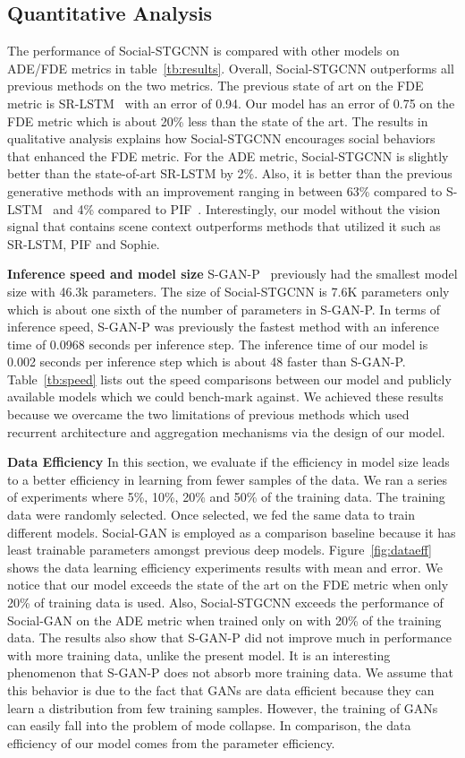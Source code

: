 \documentclass[10pt,twocolumn,letterpaper]{article}
\newcommand*{\ours}{Social-STGCNN }
\begin{document}
\subsection{Quantitative Analysis}
The performance of \ours is compared with other models on ADE/FDE metrics in table~\ref{tb:results}. Overall, \ours outperforms all previous methods on the two metrics. The previous state of art on the FDE metric is SR-LSTM~\cite{zhang2019sr} with an error of 0.94. Our model has an error of 0.75 on the FDE metric which is about 20\% less than the state of the art. The results in qualitative analysis explains how \ours encourages social behaviors that enhanced the FDE metric. For the ADE metric, \ours is slightly better than the state-of-art SR-LSTM by 2\%. Also, it is better than the previous generative methods with an improvement ranging in between 63\% compared to S-LSTM~\cite{alahi2016social} and 4\% compared to PIF~\cite{liang2019peeking}. Interestingly, our model without the vision signal that contains scene context outperforms methods that utilized it such as SR-LSTM, PIF and Sophie.

\noindent
\textbf{Inference speed and model size} S-GAN-P~\cite{gupta2018social} previously had the smallest model size with 46.3k parameters. The size of \ours is 7.6K parameters only which is about one sixth of the number of parameters in S-GAN-P. In terms of inference speed, S-GAN-P was previously the fastest method with an inference time of 0.0968 seconds per inference step. The inference time of our model is 0.002 seconds per inference step which is about 48  faster than S-GAN-P. Table~\ref{tb:speed} lists out the speed comparisons between our model and publicly available models which we could bench-mark against. We achieved these results because we overcame the two limitations of previous methods which used recurrent architecture and aggregation mechanisms via the design of our model.



\noindent
\textbf{Data Efficiency} In this section, we evaluate if the efficiency in model size leads to a better efficiency in learning from fewer samples of the data. We ran a series of experiments where 5\%, 10\%, 20\% and 50\% of the training data. The training data were randomly selected. Once selected, we fed the same data to train different models. Social-GAN is employed as a comparison baseline because it has least trainable parameters amongst previous deep models. Figure~\ref{fig:dataeff} shows the data learning efficiency experiments results with mean and error. We notice that our model exceeds the state of the art on the FDE metric when only 20\% of training data is used. Also, \ours exceeds the  performance of Social-GAN on the ADE metric when trained only on with 20\% of the training data. The results also show that S-GAN-P did not improve much in performance with more training data, unlike the present model. It is an interesting phenomenon that S-GAN-P does not absorb more training data. We assume that this behavior is due to the fact that GANs are data efficient because they can learn a distribution from few training samples. However, the training of GANs can easily fall into the problem of mode collapse. In comparison, the data efficiency of our model comes from the parameter efficiency.
\end{document}
